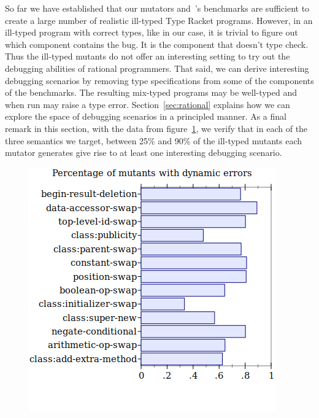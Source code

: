 So far we have established that our mutators and~\citet{gtnffvf-jfp-2019}'s 
benchmarks are sufficient to create a large number of realistic ill-typed Type Racket
programs. However, in an ill-typed program with correct types, like
in our case, it is trivial to figure out which component contains the bug.
It is the component that doesn't type check. Thus the ill-typed mutants
do not offer an interesting setting to try out the debugging abilities of
rational programmers. That said, we can derive interesting debugging
scenarios by removing type specifications from some of the components of
the benchmarks. The resulting mix-typed programs may be well-typed and when
run may raise a type error. Section~\ref{sec:rational} explains how we can
explore the space of debugging scenarios in a principled manner. As a
final remark in this section, with the data from
figure~\ref{fig:mutators-runtime-hit}, we verify  that in each of the three semantics
we target, between 25\% and
90\% of the ill-typed mutants each mutator generates give rise to at least one interesting debugging scenario.


\begin{figure}
  \centering
  \includegraphics[width=\textwidth]{./plots/code-dynamic-error}
  \caption{}
  \label{fig:mutators-runtime-hit}
\end{figure}


